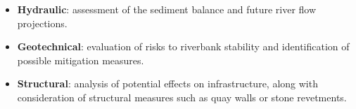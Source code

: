 \begin{itemize}
    \item \textbf{Hydraulic}: assessment of the sediment balance and future river flow projections.
    \item \textbf{Geotechnical}: evaluation of risks to riverbank stability and identification of possible mitigation measures.
    \item \textbf{Structural}: analysis of potential effects on infrastructure, along with consideration of structural measures such as quay walls or stone revetments.
\end{itemize}